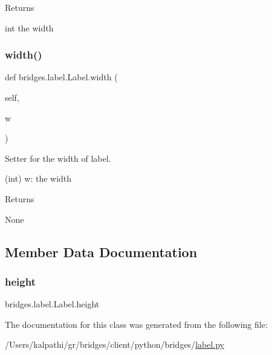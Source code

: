 \begin{DoxyReturn}{Returns}


int the width 
\end{DoxyReturn}
\mbox{\label{classbridges_1_1label_1_1_label_a724fe127712eb8672f1c377c2c2df500}} 
\subsubsection{\texorpdfstring{width()}{width()}\hspace{0.1cm}{\footnotesize\ttfamily [2/2]}}
{\footnotesize\ttfamily def bridges.\+label.\+Label.\+width (\begin{DoxyParamCaption}\item[{}]{self,  }\item[{}]{w }\end{DoxyParamCaption})}



Setter for the width of label. 

(int) w\+: the width \begin{DoxyReturn}{Returns}


None 
\end{DoxyReturn}


\subsection{Member Data Documentation}
\mbox{\label{classbridges_1_1label_1_1_label_a2bf622aa77b4ad7d6918db99a8bfd4da}} 
\subsubsection{\texorpdfstring{height}{height}}
{\footnotesize\ttfamily bridges.\+label.\+Label.\+height}



The documentation for this class was generated from the following file\+:\begin{DoxyCompactItemize}
\item 
/\+Users/kalpathi/gr/bridges/client/python/bridges/\mbox{\hyperlink{label_8py}{label.\+py}}\end{DoxyCompactItemize}
